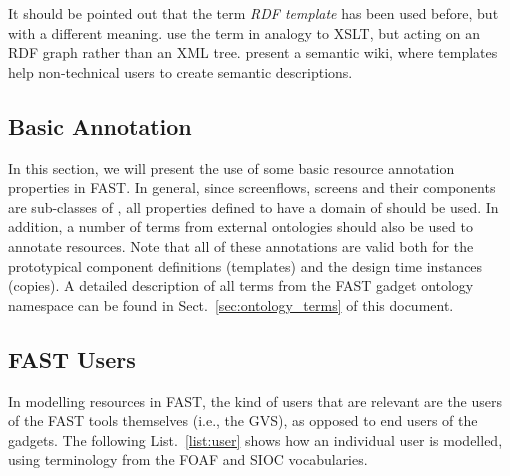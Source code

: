 \documentclass[twoside]{fast_latex}
\begin{document}
It should be pointed out that the term \emph{RDF template} has been used before, but with a different meaning. \cite{davis2003rdf_template} use the term in analogy to XSLT, but acting on an RDF graph rather than an XML tree. \cite{kawamoto2006kawawiki} present a semantic wiki, where templates help non-technical users to create semantic descriptions. 

\subsection{Basic Annotation} %
\label{sub:basic_annotation}

In this section, we will present the use of some basic resource annotation properties in FAST. In general, since screenflows, screens and their components are sub-classes of , all properties defined to have a domain of  should be used. In addition, a number of terms from external ontologies should also be used to annotate resources. Note that all of these annotations are valid both for the prototypical component definitions (templates) and the design time instances (copies). A detailed description of all terms from the FAST gadget ontology namespace can be found in Sect.~\ref{sec:ontology_terms} of this document.

\singlespacing
{}
\begin{figure}[ht]
	
\end{figure}
\doublespacing


\subsection{FAST Users} %
\label{sub:fast_users}

In modelling resources in FAST, the kind of users that are relevant are the users of the FAST tools themselves (i.e., the GVS), as opposed to end users of the gadgets. The following List.~\ref{list:user} shows how an individual user is modelled, using terminology from the FOAF and SIOC vocabularies.

\singlespacing
{}
\begin{figure}[ht]
	
\end{figure}
\doublespacing
\end{document}
